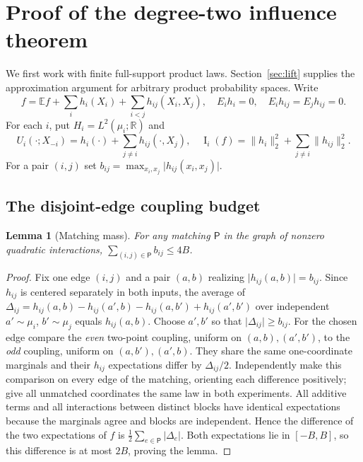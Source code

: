 \documentclass[11pt,letterpaper]{article}
\newtheorem{lemma}[theorem]{Lemma}
\theoremstyle{definition}
\newcommand{\E}{\mathbb E}
\newcommand{\Inf}{\operatorname{I}}
\newcommand{\abs}[1]{\lvert #1\rvert}
\newcommand{\norm}[1]{\lVert #1\rVert}
\begin{document}
\section{Proof of the degree-two influence theorem}\label{sec:quad}
We first work with finite full-support product laws. Section~\ref{sec:lift} supplies the approximation argument for arbitrary product probability spaces. Write
\begin{equation}\label{eq:dec}
f=\E f+\sum_i h_i(X_i)+\sum_{i<j}h_{ij}(X_i,X_j),\quad
E_i h_i=0,\quad E_i h_{ij}=E_jh_{ij}=0.
\end{equation}
For each $i$, put $H_i=L^2(\mu_i;\mathbb R)$ and
\begin{equation}\label{eq:ui}
U_i(\cdot;X_{-i})=h_i(\cdot)+\sum_{j\ne i}h_{ij}(\cdot,X_j),\quad
\Inf_i(f)=\norm{h_i}_2^2+\sum_{j\ne i}\norm{h_{ij}}_2^2.
\end{equation}
For a pair $(i,j)$ set $b_{ij}=\max_{x_i,x_j}\abs{h_{ij}(x_i,x_j)}$.

\subsection{The disjoint-edge coupling budget}
\begin{lemma}[Matching mass]\label{lem:matching}
For any matching $\mathsf P$ in the graph of nonzero quadratic interactions,
$\sum_{(i,j)\in\mathsf P}b_{ij}\le4B$.
\end{lemma}
\begin{proof}
Fix one edge $(i,j)$ and a pair $(a,b)$ realizing $\abs{h_{ij}(a,b)}=b_{ij}$. Since $h_{ij}$ is centered separately in both inputs, the average of
$\Delta_{ij}=h_{ij}(a,b)-h_{ij}(a',b)-h_{ij}(a,b')+h_{ij}(a',b')$
over independent $a'\sim\mu_i$, $b'\sim\mu_j$ equals $h_{ij}(a,b)$. Choose $a',b'$ so that $\abs{\Delta_{ij}}\ge b_{ij}$.
For the chosen edge compare the \emph{even} two-point coupling, uniform on $(a,b),(a',b')$, to the \emph{odd} coupling, uniform on $(a,b'),(a',b)$. They share the same one-coordinate marginals and their $h_{ij}$ expectations differ by $\Delta_{ij}/2$. Independently make this comparison on every edge of the matching, orienting each difference positively; give all unmatched coordinates the same law in both experiments. All additive terms and all interactions between distinct blocks have identical expectations because the marginals agree and blocks are independent. Hence the difference of the two expectations of $f$ is $\frac12\sum_{e\in\mathsf P}\abs{\Delta_e}$. Both expectations lie in $[-B,B]$, so this difference is at most $2B$, proving the lemma.
\end{proof}
\end{document}
